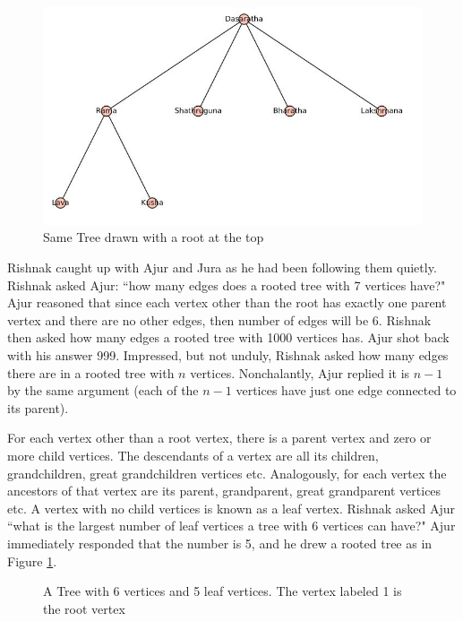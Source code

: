 \begin{figure}
\includegraphics[width=\textwidth]{tree2.JPG}
\caption{Same Tree drawn with a root at the top}
\end{figure}

Rishnak caught up with Ajur and Jura as he had been following them quietly. Rishnak asked Ajur: ``how many edges does a rooted tree with 7 vertices have?" Ajur reasoned that since each vertex other than the root has exactly one parent vertex and there are no other edges, then number of edges will be 6. Rishnak then asked how many edges a rooted tree with 1000 vertices has. Ajur shot back with his answer 999. Impressed, but not unduly, Rishnak asked how many edges there are in a rooted tree with $n$ vertices. Nonchalantly, Ajur replied it is $n-1$ by the same argument (each of the $n-1$ vertices have just one edge connected to its parent).  

For each vertex other than a root vertex, there is a parent vertex and zero or more child vertices.  The descendants of a vertex are all its children, grandchildren, great grandchildren vertices etc. Analogously, for each vertex the ancestors of that vertex are its parent, grandparent, great grandparent vertices etc. 
A vertex with no child vertices is known as a leaf vertex. Rishnak asked Ajur ``what is the largest number of leaf vertices a tree with 6 vertices can have?" Ajur immediately responded that the number is 5, and he drew a rooted tree as in Figure \ref{t1}.

\begin{figure}
\begin{center}

\caption{A Tree with 6 vertices and 5 leaf vertices. The vertex labeled 1 is the root vertex}\label{t1}
\end{center}
\end{figure}

